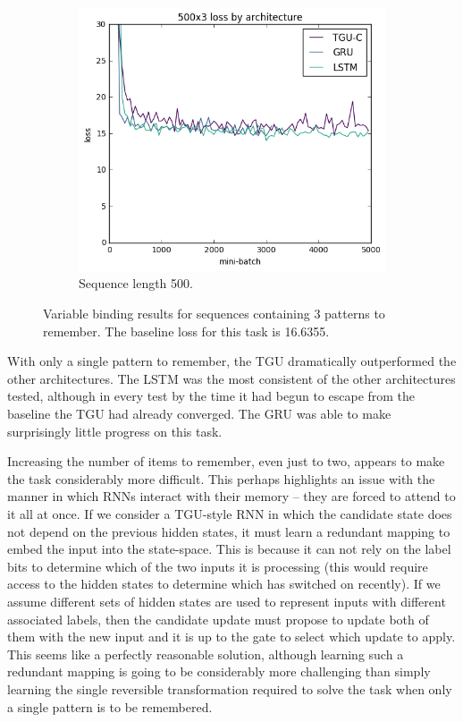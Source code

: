 \begin{figure}[p]
\begin{subfigure}[t]{0.3\linewidth}
	\includegraphics[width=\linewidth]{exps/vbind/plots/500x3}
	\caption{Sequence length 500.}
\end{subfigure}

\caption[Variable binding results, three patterns]
{Variable binding results for sequences containing \(3\) patterns to remember. The baseline loss for this
task is 16.6355.}
\label{fig:vbindn3}
\end{figure}

With only a single pattern to remember, the TGU dramatically outperformed the other
architectures. The LSTM was the most consistent of the other architectures tested,
although in every test by the time it had begun to escape from the baseline the TGU
had already converged. The GRU was able to make surprisingly little progress on this
task.

Increasing the number of items to remember, even just to two, appears to make the
task considerably more difficult. This perhaps highlights an issue with the manner
in which RNNs interact with their memory -- they are forced to attend to it all
at once. If we consider a TGU-style RNN in which the candidate state does not
depend on the previous hidden states, it must learn a redundant mapping to embed
the input into the state-space. This is because it can not rely on the label
bits to determine which of the two inputs it is processing (this would require
access to the hidden states to determine which has switched on recently). If we
assume different sets of hidden states are used to represent inputs with different
associated labels, then the candidate update must propose to update both of them
with the new input and it is up to the gate to select which update to apply.
This seems like a perfectly reasonable solution, although learning such a redundant
mapping is going to be considerably more challenging than simply learning the single
reversible transformation required to solve the task when only a single pattern
is to be remembered. 


